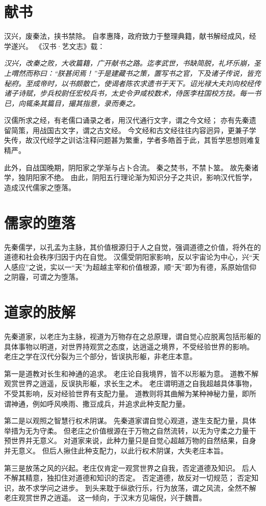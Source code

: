 \documentclass[11pt]{article}
\begin{document}
\section{献书}
汉兴，废秦法，挟书禁除。
自孝惠降，政府致力于整理典籍，献书解经成风，经学遂兴。
《汉书·艺文志》载：

\textit{汉兴，改秦之败，大收篇籍，广开献书之路。迄孝武世，书缺简脱，礼坏乐崩，圣上喟然而称曰：“朕甚闵焉！”于是建藏书之策，置写书之官，下及诸子传说，皆充秘府。至成帝时，以书颇散亡，使谒者陈农求遗书于天下。诏光禄大夫刘向校经传诸子诗赋，步兵校尉任宏校兵书，太史令尹咸校数术，侍医李柱国校方技。每一书已，向辄条其篇目，撮其指意，录而奏之。}

汉儒所求之经，有老儒口诵录之者，用汉代通行文字，谓之今文经；
亦有先秦遗留简策，用战国古文字，谓之古文经。
今文经和古文经往往内容迥异，更兼子学失传，故汉代经学之训诂注释问题甚为繁重，学者多皓首于此，其哲学思想则难复精严。

\newline

此外，自战国晚期，阴阳家之学渐与占卜合流。
秦之焚书，不禁卜筮。
故先秦诸学，独阴阳家不绝。
由此，阴阳五行理论渐为知识分子之共识，影响汉代哲学，造成汉代儒家之堕落。

\section{儒家的堕落}
先秦儒学，以孔孟为主脉，其价值根源归于人之自觉，强调道德之价值，将外在的道德和社会秩序归因于内在自觉。
汉儒受阴阳家影响，反以宇宙论为中心，兴“天人感应”之说，实以一“天”为超越主宰和价值根源，顺“天”即为有德，系原始信仰之阴霾，可谓之为堕落。

\section{道家的肢解}
先秦道家，以老庄为主脉，视道为万物存在之总原理，谓自觉心应脱离包括形躯的具体事物以明道，对世界持观赏之态度，达逍遥之境界，不受经验世界的影响。
老庄之学在汉代分裂为三个部分，皆误执形躯，非老庄本意。

\newline

第一是道教对长生和神通的追求。
老庄论自我境界，皆不以形躯为意。
道教不解观赏世界之逍遥，反误执形躯，求长生之术。
老庄谓明道之自我超越具体事物，不受其影响，反对经验世界有支配力量。
道教则将其曲解为某种神秘力量，即所谓神通，例如呼风唤雨、撒豆成兵，并追求此种支配力量。

\newline

第二是以观照之智慧行权术阴谋。
先秦道家谓自觉心观道，遂生支配力量，具体举措为无为守柔。
但老庄之价值根源在于万物之自然流转，以无为守柔之力量干预世界并无意义。
对道家来说，此种力量只是自觉心超越万物的自然结果，自身并无意义。
但后人揪住此种支配力，以此行权术阴谋，大失老庄本旨。

\newline

第三是放荡之风的兴起。老庄仅肯定一观赏世界之自我，否定道德及知识。
后人不解其精意，独扣住对道德和知识的否定。
否定道德，故反对一切规范；
否定知识，故不求学问之进步。
到头来耽于纵欲行乐，行为放荡，谓之风流，全然不解老庄观赏世界之逍遥。
这一倾向，于汉末方见端倪，兴于魏晋。
\end{document}
